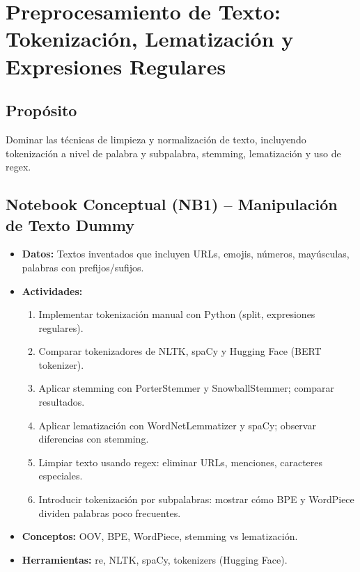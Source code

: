 \documentclass[12pt,a4paper]{article}
\begin{document}
\section{Preprocesamiento de Texto: Tokenización, Lematización y Expresiones Regulares}
\subsection*{Propósito}
Dominar las técnicas de limpieza y normalización de texto, incluyendo tokenización a nivel de palabra y subpalabra, stemming, lematización y uso de regex.

\subsection*{Notebook Conceptual (NB1) – Manipulación de Texto Dummy}
\begin{itemize}
    \item \textbf{Datos:} Textos inventados que incluyen URLs, emojis, números, mayúsculas, palabras con prefijos/sufijos.
    \item \textbf{Actividades:}
    \begin{enumerate}
        \item Implementar tokenización manual con Python (split, expresiones regulares).
        \item Comparar tokenizadores de NLTK, spaCy y Hugging Face (BERT tokenizer).
        \item Aplicar stemming con PorterStemmer y SnowballStemmer; comparar resultados.
        \item Aplicar lematización con WordNetLemmatizer y spaCy; observar diferencias con stemming.
        \item Limpiar texto usando regex: eliminar URLs, menciones, caracteres especiales.
        \item Introducir tokenización por subpalabras: mostrar cómo BPE y WordPiece dividen palabras poco frecuentes.
    \end{enumerate}
    \item \textbf{Conceptos:} OOV, BPE, WordPiece, stemming vs lematización.
    \item \textbf{Herramientas:} re, NLTK, spaCy, tokenizers (Hugging Face).
\end{itemize}
\end{document}
